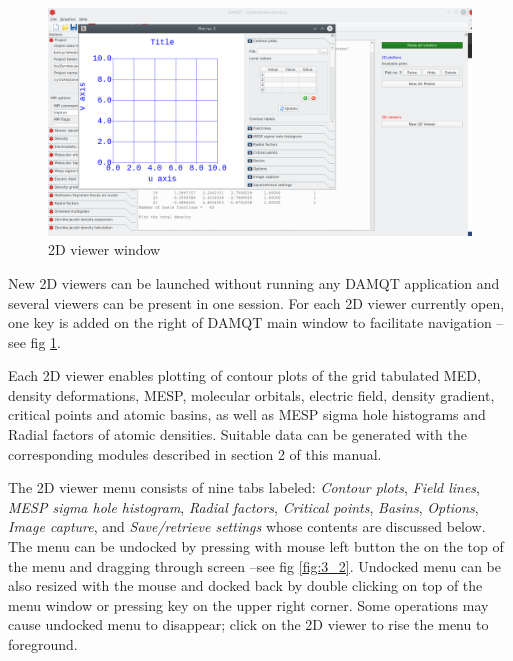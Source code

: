 \documentclass[10pt]{article}
\begin{document}
\vspace*{5mm}

\begin{figure}[H]
\begin{center}
\vspace*{0mm}
\includegraphics[width=.5\linewidth]{damqt320_2D_start_window.png}
\end{center}
\vspace*{0cm}
\caption{{2D viewer window}\label{fig:3_1}}
\end{figure}

\vspace*{1cm}

New 2D viewers can be launched without running any DAMQT application and several viewers can be present in one session. For each 2D viewer currently open, one key is added on the right of DAMQT 
main window to facilitate navigation --see fig \ref{fig:3_1}. 

Each 2D viewer enables plotting of 
contour plots of the grid tabulated
MED, density deformations, MESP, molecular orbitals, electric field, density gradient, critical points and atomic basins, as well as MESP sigma hole histograms and Radial factors of atomic densities.
Suitable data can be generated with the
corresponding modules described in section 2 of this manual.  

The 2D viewer menu consists of nine tabs
labeled: {\it Contour plots}, {\it Field lines}, {\it MESP sigma hole histogram}, {\it Radial factors}, {\it Critical points}, {\it Basins}, 
{\it Options}, {\it Image capture}, and {\it Save/retrieve settings} whose contents are discussed below.
The menu can be undocked by
pressing with mouse left button the on the top of the menu and dragging through screen
--see fig \ref{fig:3_2}. Undocked menu can be
also resized with the mouse and docked back by double clicking on top of the menu window or
pressing key \undock on the upper right corner. Some operations may cause undocked menu to disappear;
click on the 2D viewer to rise the menu to foreground.
\end{document}
